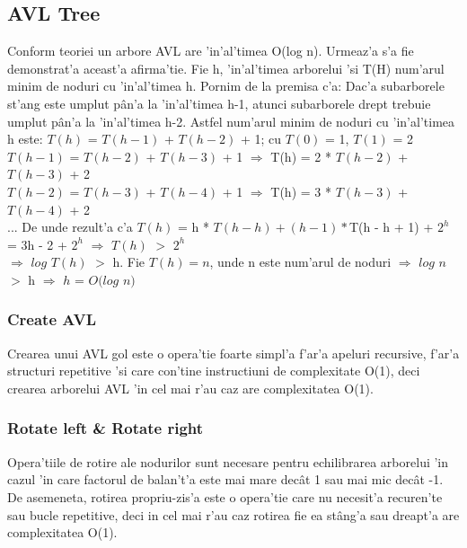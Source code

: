 \subsection{AVL Tree}
Conform teoriei un arbore AVL are 'in'al'timea O(log n). Urmeaz'a s'a fie demonstrat'a aceast'a afirma'tie. Fie h, 'in'al'timea arborelui 'si T(H) num'arul minim de noduri cu 'in'al'timea h. Pornim de la premisa c'a: Dac'a subarborele st'ang este umplut p\^an'a la 'in'al'timea h-1, atunci subarborele drept trebuie umplut p\^an'a la 'in'al'timea h-2. Astfel num'arul minim de noduri cu 'in'al'timea h este:
\newline
$T(h)$ = $T(h - 1)$ + $T(h - 2)$ + 1; cu $T(0)$ = 1, $ T(1)$ = 2 \\
$T(h - 1)$ = $T(h - 2)$ + $T(h - 3)$ + 1 $\Rightarrow$ T(h) = 2 *  $T(h - 2)$ + $T(h - 3)$ + 2\\
$T(h - 2)$ = $T(h - 3)$ + $T(h - 4)$ + 1 $\Rightarrow$ T(h) = 3 *  $T(h - 3)$ + $T(h - 4)$ + 2\\
...
De unde rezult'a c'a $T(h)$ = h * $T(h - h) + (h - 1) * $T(h - h + 1) + $2^{h}$ = 3h - 2 + $2^{h}$ $\Rightarrow$ $T(h)$  $>$ $2^{h}$\\
$\Rightarrow$  $log$ $T(h)$ $>$ h. Fie $T(h) = n$, unde n este num'arul de noduri $\Rightarrow$ $log$ $n$ $>$ h $\Rightarrow$ $h$ = $O(log$ $n)$
\vspace{5 mm}
\subsubsection{Create AVL}
Crearea unui AVL gol este o opera'tie foarte simpl'a f'ar'a apeluri recursive, f'ar'a structuri repetitive 'si care con'tine instructiuni de complexitate O(1), deci crearea arborelui AVL 'in cel mai r'au caz are complexitatea O(1).
\vspace{5 mm}
\subsubsection{Rotate left \& Rotate right}
Opera'tiile de rotire ale nodurilor sunt necesare pentru echilibrarea arborelui 'in cazul 'in care factorul de balan't'a este mai mare dec\^at 1 sau mai mic dec\^at -1. De asemeneta, rotirea propriu-zis'a este o opera'tie care nu necesit'a recuren'te sau bucle repetitive, deci in cel mai r'au caz rotirea fie ea st\^ang'a sau dreapt'a are complexitatea O(1).
\vspace{5 mm}
